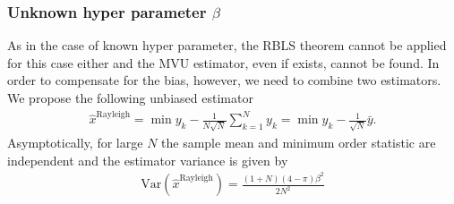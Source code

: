 \documentclass[journal]{IEEEtran}
\newcommand{\Var}{\mathrm{Var}}
\begin{document}
\subsubsection{Unknown hyper parameter $\beta$}
As in the case of known hyper parameter, the RBLS theorem cannot be applied for this case either and the MVU estimator, even if exists, cannot be found. In order to compensate for the bias, however, we need to combine two estimators.  We propose the following unbiased estimator
%
%
\begin{align}
\hat{x}^{\mathrm{Rayleigh}} = \min y_k - \frac{1}{N\sqrt{N}}\sum_{k=1}^{N}y_k = \min y_k - \frac{1}{\sqrt{N}}\bar{y}.
\end{align}
%
% 
Asymptotically, for large $N$ the sample mean and minimum order statistic are independent and the estimator variance is given by
%
%
\begin{align}
\Var(\hat{x}^{\mathrm{Rayleigh}})=\frac{(1+N)(4-\pi)\beta^2}{2N^2}
\label{eq:minimum_orde_unknown_rayleigh}
\end{align}
%
%
\end{document}
